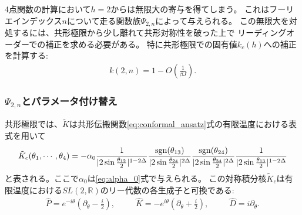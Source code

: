 4点関数の計算において$h = 2$からは無限大の寄与を得てしまう。
これはフーリエインデックス$n$について走る関数族$\Psi_{2,n}$によって与えられる。
この無限大を対処するには、共形極限から少し離れて共形対称性を破った上で
リーディングオーダーでの補正を求める必要がある。
特に共形極限での固有値$k_c(h)$への補正を計算する:
\begin{align}
	k(2, n) = 1 - O\left(\frac{1}{\beta J}\right).
\end{align}

\subsubsection{$\Psi_{2,n}$とパラメータ付け替え}
共形極限では、$\tilde{K}$は共形伝搬関数\eqref{eq:conformal_ansatz}式の有限温度における表式を用いて
\begin{align}
	\tilde{K}_c(\theta_1, \cdots, \theta_4)
	= -\alpha_0
		\frac{1}{|2\sin\frac{\theta_{12}}{2}|^{1-2\Delta}}
		\frac{\mathrm{sgn}(\theta_{13})}{|2\sin\frac{\theta_{24}}{2}|^{2\Delta}}
		\frac{\mathrm{sgn}(\theta_{24})}{|2\sin\frac{\theta_{34}}{2}|^{2\Delta}}
		\frac{1}{|2\sin\frac{\theta_{13}}{2}|^{1-2\Delta}}
\end{align}
と表される。ここで$\alpha_0$は\eqref{eq:alpha_0}式で与えられる。
この対称積分核$\tilde{K}_c$は有限温度における$SL(2, \mathbb{R})$のリー代数の各生成子と可換である:
\begin{align}
	\hat{P} = e^{-i\theta}\left(\partial_{\theta} - \frac{i}{2}\right),\hspace{30pt}
	\hat{K} = -e^{i\theta}\left(\partial_{\theta} + \frac{i}{2}\right),\hspace{30pt}
	\hat{D} = i\partial_{\theta}.
\end{align}


\pagebreak
